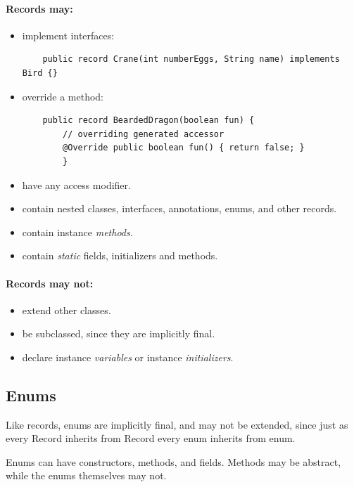 \documentclass{scrartcl}
\begin{document}
    \paragraph{Records may:}

    \begin{itemize}
    \item implement interfaces:
    \begin{lstlisting}
    public record Crane(int numberEggs, String name) implements Bird {}
    \end{lstlisting}
    \item override a method:
    \begin{lstlisting}
    public record BeardedDragon(boolean fun) {
        // overriding generated accessor
        @Override public boolean fun() { return false; }
        }
    \end{lstlisting}
    \item have any access modifier.
    \item contain nested classes, interfaces, annotations, enums, and other records.
    \item contain instance \textit{methods}.
    \item contain \textit{static} fields, initializers and methods.
    \end{itemize}

    \paragraph{Records may not:}

    \begin{itemize}
        \item extend other classes.
        \item be subclassed, since they are implicitly final.
        \item  declare instance \textit{variables} or instance \textit{initializers}.
    \end{itemize}

\subsection{Enums}

    Like records, enums are implicitly final, and may not be extended, since just as every Record inherits from Record every enum inherits from enum.

    Enums can have constructors, methods, and fields. Methods may be abstract, while the enums themselves may not.
\end{document}
